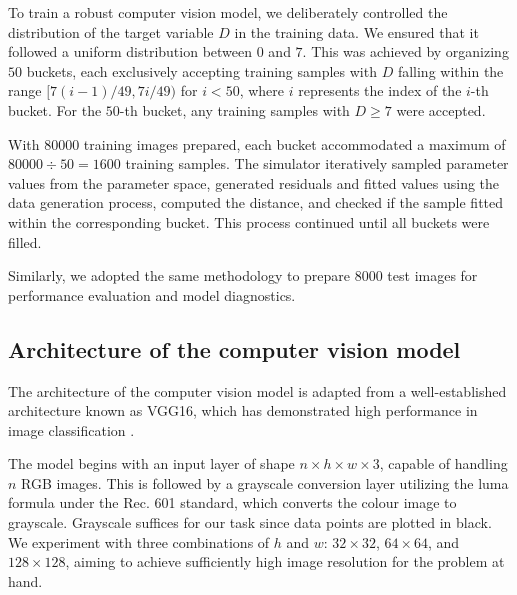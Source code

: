 \documentclass[]{interact}
\theoremstyle{plain}%
\theoremstyle{definition}
\theoremstyle{remark}
\begin{document}
To train a robust computer vision model, we deliberately controlled the
distribution of the target variable \(D\) in the training data. We
ensured that it followed a uniform distribution between \(0\) and \(7\).
This was achieved by organizing \(50\) buckets, each exclusively
accepting training samples with \(D\) falling within the range
\([7(i - 1)/49, 7i/49)\) for \(i < 50\), where \(i\) represents the
index of the \(i\)-th bucket. For the \(50\)-th bucket, any training
samples with \(D \geq 7\) were accepted.

With 80000 training images prepared, each bucket accommodated a maximum
of \(80000 \div 50 = 1600\) training samples. The simulator iteratively
sampled parameter values from the parameter space, generated residuals
and fitted values using the data generation process, computed the
distance, and checked if the sample fitted within the corresponding
bucket. This process continued until all buckets were filled.

Similarly, we adopted the same methodology to prepare 8000 test images
for performance evaluation and model diagnostics.

\hypertarget{architecture-of-the-computer-vision-model}{%
\subsection{Architecture of the computer vision
model}\label{architecture-of-the-computer-vision-model}}

The architecture of the computer vision model is adapted from a
well-established architecture known as VGG16, which has demonstrated
high performance in image classification \citep{simonyan2014very}.

The model begins with an input layer of shape
\(n \times h \times w \times 3\), capable of handling \(n\) RGB images.
This is followed by a grayscale conversion layer utilizing the luma
formula under the Rec. 601 standard, which converts the colour image to
grayscale. Grayscale suffices for our task since data points are plotted
in black. We experiment with three combinations of \(h\) and \(w\):
\(32 \times 32\), \(64 \times 64\), and \(128 \times 128\), aiming to
achieve sufficiently high image resolution for the problem at hand.
\end{document}
